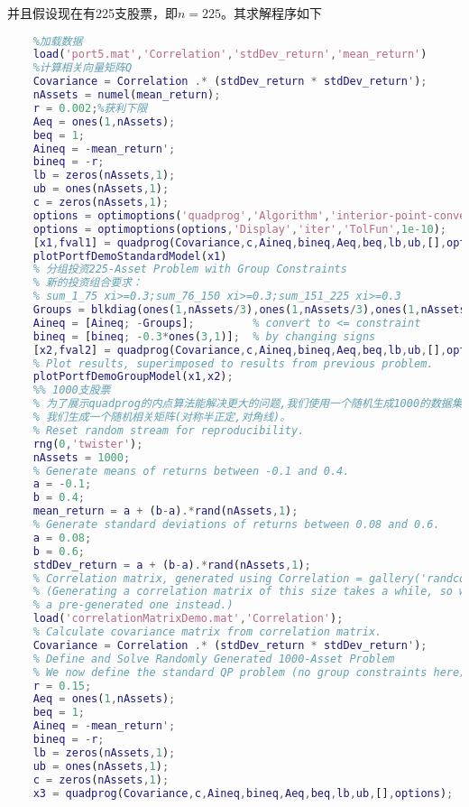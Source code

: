     并且假设现在有225支股票，即$n=225$。其求解程序如下
    \begin{lstlisting}[language = Matlab]
    %% 组合投资二次规划问题
    %加载数据
    load('port5.mat','Correlation','stdDev_return','mean_return')
    %计算相关向量矩阵Q
    Covariance = Correlation .* (stdDev_return * stdDev_return');
    nAssets = numel(mean_return);
    r = 0.002;%获利下限
    Aeq = ones(1,nAssets);
    beq = 1;
    Aineq = -mean_return';
    bineq = -r;
    lb = zeros(nAssets,1);
    ub = ones(nAssets,1);
    c = zeros(nAssets,1);
    options = optimoptions('quadprog','Algorithm','interior-point-convex');
    options = optimoptions(options,'Display','iter','TolFun',1e-10);
    [x1,fval1] = quadprog(Covariance,c,Aineq,bineq,Aeq,beq,lb,ub,[],options);
    plotPortfDemoStandardModel(x1)
    % 分组投资225-Asset Problem with Group Constraints
    % 新的投资组合要求：
    % sum_1_75 xi>=0.3;sum_76_150 xi>=0.3;sum_151_225 xi>=0.3
    Groups = blkdiag(ones(1,nAssets/3),ones(1,nAssets/3),ones(1,nAssets/3));
    Aineq = [Aineq; -Groups];         % convert to <= constraint
    bineq = [bineq; -0.3*ones(3,1)];  % by changing signs
    [x2,fval2] = quadprog(Covariance,c,Aineq,bineq,Aeq,beq,lb,ub,[],options);
    % Plot results, superimposed to results from previous problem.
    plotPortfDemoGroupModel(x1,x2);
    %% 1000支股票
    % 为了展示quadprog的内点算法能解决更大的问题,我们使用一个随机生成1000的数据集。
    % 我们生成一个随机相关矩阵(对称半正定,对角线)。
    % Reset random stream for reproducibility.
    rng(0,'twister');
    nAssets = 1000;
    % Generate means of returns between -0.1 and 0.4.
    a = -0.1;
    b = 0.4;
    mean_return = a + (b-a).*rand(nAssets,1);
    % Generate standard deviations of returns between 0.08 and 0.6.
    a = 0.08;
    b = 0.6;
    stdDev_return = a + (b-a).*rand(nAssets,1);
    % Correlation matrix, generated using Correlation = gallery('randcorr',nAssets).
    % (Generating a correlation matrix of this size takes a while, so we load
    % a pre-generated one instead.)
    load('correlationMatrixDemo.mat','Correlation');
    % Calculate covariance matrix from correlation matrix.
    Covariance = Correlation .* (stdDev_return * stdDev_return');
    % Define and Solve Randomly Generated 1000-Asset Problem
    % We now define the standard QP problem (no group constraints here) and solve.
    r = 0.15;
    Aeq = ones(1,nAssets);
    beq = 1;
    Aineq = -mean_return';
    bineq = -r;
    lb = zeros(nAssets,1);
    ub = ones(nAssets,1);
    c = zeros(nAssets,1);
    x3 = quadprog(Covariance,c,Aineq,bineq,Aeq,beq,lb,ub,[],options);
    \end{lstlisting}
